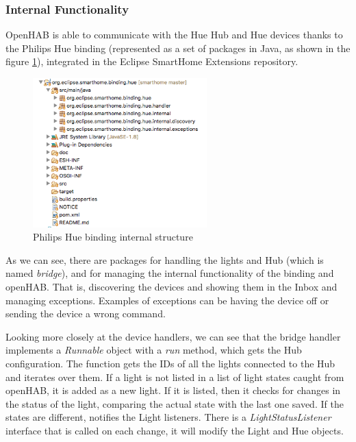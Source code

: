 \subsubsection{Internal Functionality}
OpenHAB is able to communicate with the Hue Hub and Hue devices thanks to the Philips Hue binding (represented as a set of packages
in Java, as shown in the figure \ref{fig:hue-binding-structure}), integrated in the Eclipse SmartHome Extensions repository.

\begin{figure}
    \centering
    \includegraphics[width=0.6\textwidth]{images/Chapter_06/hue-binding-structure.png}
    \caption{Philips Hue binding internal structure}
    \label{fig:hue-binding-structure}
\end{figure}

As we can see, there are packages for handling the lights and Hub (which is named \textit{bridge}), and for managing the internal
functionality of the binding and openHAB. That is, discovering the devices and showing them in the Inbox and managing exceptions.
Examples of exceptions can be having the device off or sending the device a wrong command.

Looking more closely at the device handlers, we can see that the bridge handler implements a \textit{Runnable} object with a
\textit{run} method, which gets the Hub configuration. The function gets the IDs of all the lights connected to the Hub and iterates
over them. If a light is not listed in a list of light states caught from openHAB, it is added as a new light. If it is listed, then
it checks for changes in the status of the light, comparing the actual state with the last one saved. If the states are different,
notifies the Light listeners. There is a \textit{LightStatusListener} interface that is called on each change, it will modify the
Light and Hue objects.

